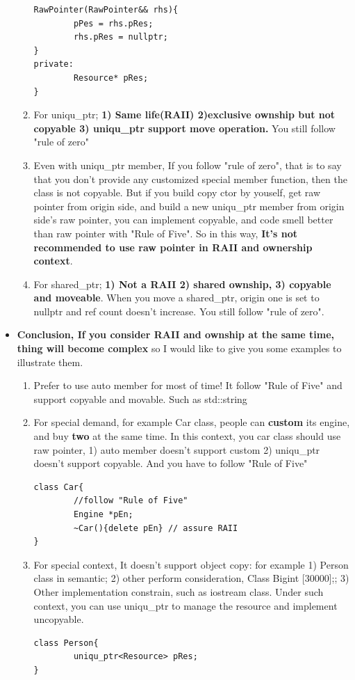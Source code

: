 \documentclass[a4paper,11pt,twoside]{book}
\begin{document}
\begin{itemize}
\begin{enumerate}
\begin{lstlisting}[numbers=none]
RawPointer(RawPointer&& rhs){
		pPes = rhs.pRes;
		rhs.pRes = nullptr;
}
private:
		Resource* pRes;
}
\end{lstlisting}
		
		\item For uniqu\_ptr; \textbf{1) Same life(RAII) 2)exclusive ownship but not copyable 3) uniqu\_ptr support move operation. } You still follow "rule of zero"
		
		\item Even with uniqu\_ptr member, If you follow "rule of zero", that is to say that you don't provide any customized special member function, then the class is not copyable. But if you build copy ctor by youself, get raw pointer from origin side, and build a new uniqu\_ptr member from origin side's raw pointer, you can implement copyable, and code smell better than raw pointer with "Rule of Five". So in this way, \textbf{It's not recommended to use raw pointer in RAII and ownership context}.
		
		\item For shared\_ptr; \textbf{1) Not a RAII 2) shared ownship, 3) copyable and moveable}. When you move a shared\_ptr, origin one is set to nullptr and ref count doesn't increase.  You still follow "rule of zero".
		
	\end{enumerate}
	
	\item \textbf{ Conclusion, If you consider RAII and ownship at the same time, thing will become complex}  so I would like to give you some examples to illustrate them.
	
	\begin{enumerate}
		\item Prefer to use auto member for most of time! It follow "Rule of Five" and support copyable and movable. Such as std::string
		
		\item  For special demand, for example Car class,  people can \textbf{custom} its engine, and buy \textbf{two} at the same time. In this context, you car class should use raw pointer, 1) auto member doesn't support custom 2) uniqu\_ptr doesn't support copyable.  And you have to follow "Rule of Five"
\begin{lstlisting}[numbers=none]
class Car{
		//follow "Rule of Five"
		Engine *pEn;
		~Car(){delete pEn} // assure RAII
}
\end{lstlisting}
		
		\item For special context, It doesn't support object copy: for example 1) Person class in semantic;  2) other  perform consideration, Class Big{int [30000];};  3) Other implementation constrain, such as iostream class.   Under such context, you can use uniqu\_ptr to manage the resource and implement uncopyable.
\begin{lstlisting}[numbers=none]
class Person{
		uniqu_ptr<Resource> pRes;
}
\end{lstlisting}
		

\end{enumerate}
\end{itemize}
\end{document}
